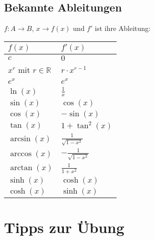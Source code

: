 \documentclass[11pt]{article} %
\begin{document}
\subsection{Bekannte Ableitungen}

$f: A \rightarrow B$, $x \rightarrow f(x)$ und $f'$ ist ihre Ableitung:

\begin{table}[h]
\centering
    \begin{tabular}{|l|l|}
        \hline
        $f(x)$                       & $f'(x)$                   \\ \hline
        $c$                          & $0$                       \\ 
        $x^r$ mit $r \in \mathbb{R}$ & $r\cdot x^{r-1}$          \\ 
        $e^x$                        & $e^x$                     \\ 
        $\ln(x)$                     & $\frac{1}{x}$             \\ 
        $\sin(x)$                    & $\cos(x)$                 \\ 
        $\cos(x)$                    & $-\sin(x)$                \\ 
        $\tan(x)$                    & $1+\tan^2(x)$             \\ 
        $\arcsin(x)$                 & $\frac{1}{\sqrt{1-x^2}}$  \\ 
        $\arccos(x)$                 & $-\frac{1}{\sqrt{1-x^2}}$ \\ 
        $\arctan(x)$                 & $\frac{1}{1+x^2}$         \\ 
        $\sinh(x)$                   & $\cosh(x)$                \\ 
        $\cosh(x)$                   & $\sinh(x)$                \\
        \hline 
    \end{tabular}
\end{table}



\section{Tipps zur Übung}
\end{document}
